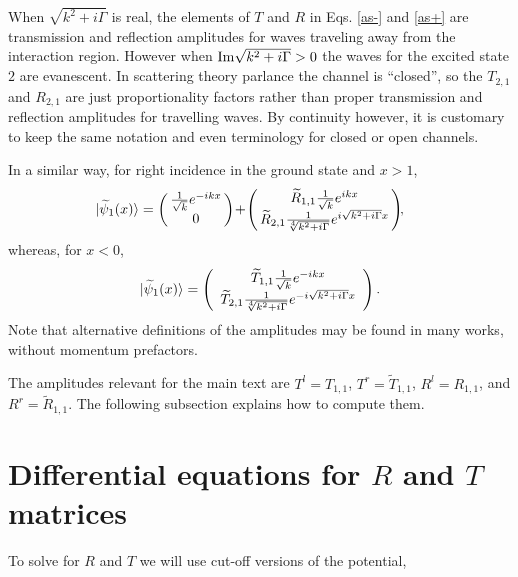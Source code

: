 %
When $\sqrt{k^2+i \Gamma}$ is real, the elements of $T$ and $R$ in Eqs. \eqref{as-} and \eqref{as+}
are transmission and reflection amplitudes for waves traveling away from the interaction region.
However when  ${\rm Im}\sqrt{k^2+i \Gamma}>0$ the waves for the excited state $2$ are evanescent.
In scattering theory parlance the channel is ``closed'', so  the $T_{2,1}$ and $R_{2,1}$ are just proportionality factors
rather than proper transmission
and reflection amplitudes for travelling waves. By continuity however, it is customary to keep the same notation
and even terminology for closed or open channels.


In a similar way, for right incidence in the ground state and
$x > 1$,
%
\begin{eqnarray}
	\hspace*{-.5cm}|\widetilde\psi_1 (x)\ra = \left(\!\!\begin{array}{c} \frac{1}{\sqrt{k}}e^{-i k x} \\ 0\end{array}\!\!\right)
	\!+\! \left(\!\!\begin{array}{c}
	\widetilde R_{1,1} \frac{1}{\sqrt{k}}e^{i k x}
	\\
	\widetilde R_{2,1} \frac{1}{\sqrt[4]{k^2+i \Gamma}} e^{i \sqrt{k^2+i \Gamma} x}
	\end{array}\!\!\right)\!\!,
\end{eqnarray}
%
whereas, for $x<0$,
%
\begin{eqnarray}
	|\widetilde \psi_1 (x)\rangle = \left(\begin{array}{c}
	\widetilde T_{1,1} \frac{1}{\sqrt{k}}e^{-i k x} \\
	\widetilde T_{2,1} \frac{1}{\sqrt[4]{k^2+i \Gamma}} e^{-i \sqrt{k^2+i \Gamma} x}
	\end{array}\right).
\end{eqnarray}
%
Note that alternative definitions of the amplitudes may be found in many works,
without momentum prefactors.

The amplitudes relevant for the main text are $T^l=T_{1,1}$,
$T^r=\widetilde{T}_{1,1}$, $R^l=R_{1,1}$, and $R^r=\widetilde{R}_{1,1}$.  The following
subsection explains how to compute them.


\section{Differential equations for $R$ and $T$ matrices}
To solve for $R$ and $T$ we will use cut-off versions of the  potential,
%

